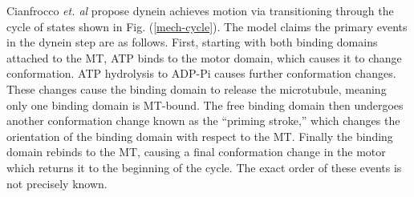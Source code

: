 \documentclass[
11pt, %
english, %
singlespacing, %
headsepline, %
chapterinoneline, %
]{MastersDoctoralThesis} %
\begin{document}
Cianfrocco \textit{et. al} \cite{cianfroccoreview} propose dynein achieves motion via transitioning through the cycle of states shown in Fig. (\ref{mech-cycle}). The model claims the primary events in the dynein step are as follows. First, starting with both binding domains attached to the MT, ATP binds to the motor domain, which causes it to change conformation. ATP hydrolysis to ADP-Pi causes further conformation changes. These changes cause the binding domain to release the microtubule, meaning only one binding domain is MT-bound. The free binding domain then undergoes another conformation change known as the ``priming stroke,'' which changes the orientation of the binding domain with respect to the MT. Finally the binding domain rebinds to the MT, causing a final conformation change in the motor which returns it to the beginning of the cycle. The exact order of these events is not precisely known.\\
\end{document}
